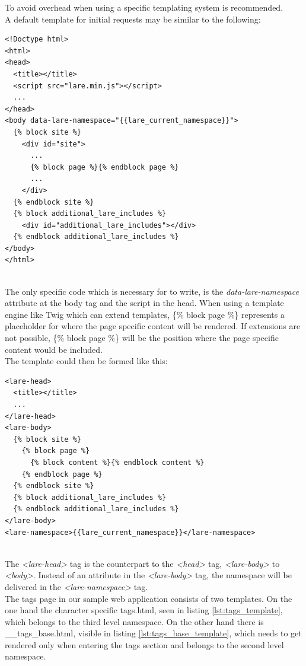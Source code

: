To avoid overhead when using \lare{} a specific templating system is recommended.
\\
A default template for initial requests may be similar to the following:

\begin{minipage}[c]{0.95\linewidth}
\begin{lstlisting}[caption=\_\_base.html, label=lst:example_lare_base_template]
<!Doctype html>
<html>
<head>
  <title></title>
  <script src="lare.min.js"></script>
  ...
</head>
<body data-lare-namespace="{{lare_current_namespace}}">
  {% block site %}
    <div id="site">
      ...
      {% block page %}{% endblock page %}
      ...
    </div>
  {% endblock site %}
  {% block additional_lare_includes %}
    <div id="additional_lare_includes"></div>
  {% endblock additional_lare_includes %}
</body>
</html>
\end{lstlisting}
\end{minipage}
\\
The only specific code which is necessary for \lare{} to write, is the \emph{data-lare-namespace} attribute at the body tag and the script in the head.
When using a template engine like Twig which can extend templates, \{\% block page \%\} represents a placeholder for where the page specific content will be rendered.
If extensions are not possible, \{\% block page \%\} will be the position where the page specific content would be included.
\\
The \lare{} template could then be formed like this:

\begin{minipage}[c]{0.95\linewidth}
\begin{lstlisting}[caption=\_\_lare.html, label=lst:example_lare_template]
<lare-head>
  <title></title>
  ...
</lare-head>
<lare-body>
  {% block site %}
    {% block page %}
      {% block content %}{% endblock content %}
    {% endblock page %}
  {% endblock site %}
  {% block additional_lare_includes %}
  {% endblock additional_lare_includes %}
</lare-body>
<lare-namespace>{{lare_current_namespace}}</lare-namespace>
\end{lstlisting}
\end{minipage}
\\
The \emph{<lare-head>} tag is the counterpart to the \emph{<head>} tag, \emph{<lare-body>} to \emph{<body>}.
Instead of an attribute in the \emph{<lare-body>} tag, the namespace will be delivered in the \emph{<lare-namespace>} tag.
\\
The tags page in our sample web application consists of two templates.
On the one hand the character specific tags.html, seen in listing \ref{lst:tags_template}, which belongs to the third level namespace.
On the other hand there is \_\_tags\_base.html, visible in listing \ref{lst:tags_base_template}, which needs to get rendered only when entering the tags section and belongs to the second level namespace.

